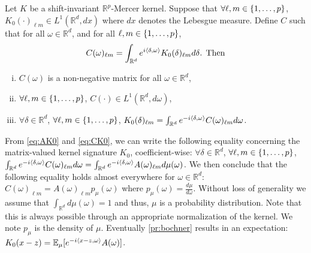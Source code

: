 \documentclass[twocolumn]{article}
\begin{document}
\begin{proposition}
    \label{pr:inverse_ovk_Fourier_decomposition}
    Let $K$ be a shift-invariant $\mathbb{R}^p$-Mercer kernel. Suppose that
    $\forall \ell, m \in {\left\{1, \ldots, p\right\}}$, $K_0(\cdot)_{\ell m}\in
    L^1(\mathbb{R}^d,dx)$ where $dx$ denotes the Lebesgue measure. Define $C$
    such that for all $\omega \in \mathbb{R}^d$, and for all $\ell,m
    \in {\left\{1, \ldots, p\right\}}$,
    \begin{equation}\label{eq:CK0}
        C(\omega)_{\ell m} = \int_{\mathbb{R}^d} e^{i
        \langle\delta,\omega\rangle}K_0(\delta)_{\ell m}d\delta\text{. Then}
    \end{equation}
    \begin{enumerate}[i)]
        \item $C(\omega)$ is a non-negative matrix for all
        $\omega\in\mathbb{R}^d$,
        \item $\forall \ell, m \in {\left\{1, \ldots, p\right\}}$, $C(\cdot)\in
        L^1(\mathbb{R}^d,d\omega)$,
        \item $\forall\delta\in\mathbb{R}^d$, $\forall \ell,m \in {\left\{1, \ldots, p\right\}}$,
        $K_0(\delta)_{\ell m}=\int_{\mathbb{R}^d}e^{-i
        \langle\delta,\omega\rangle}C(\omega)_{\ell m}d\omega$.
    \end{enumerate}
\end{proposition}
From \cref{eq:AK0} and \cref{eq:CK0}, we can write the following equality
concerning the matrix-valued kernel signature $K_0$, coefficient-wise: $\forall
\delta \in \mathbb{R}^d$, $\forall \ell, m \in {\left\{1, \ldots, p\right\}}$, $
\int_{\mathbb{R}^d}e^{-i\langle\delta, \omega\rangle}C(\omega)_{\ell
m}d\omega=\int_{\mathbb{R}^d}e^{-i \langle\delta, \omega\rangle}A(\omega)_{\ell
m}d\mu(\omega)$.  We then conclude that the following equality holds almost
everywhere for $\omega \in \mathbb{R}^d$: $C(\omega)_{\ell m}=A(\omega)_{\ell
m}p_{\mu}(\omega)$ where $p_{\mu}(\omega)=\frac{d\mu}{d\omega}$. Without loss
of generality we assume that $\int_{\mathbb{R}^d} d\mu(\omega)=1$ and thus,
$\mu$ is a probability distribution. Note that this is always possible through
an appropriate normalization of the kernel. We note $p_{\mu}$ is the density of
$\mu$. Eventually \cref{pr:bochner} results in an expectation: $ K_0(x-z)=
{\mathbb{E}}_{\mu}[e^{-i\langle x-z,\omega\rangle} A(\omega)]$.
\end{document}
